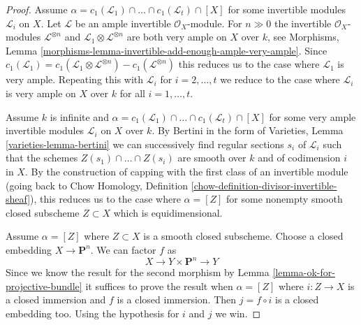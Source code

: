 \begin{proof}
\medskip\noindent
Assume
$\alpha = c_1(\mathcal{L}_1) \cap \ldots \cap c_1(\mathcal{L}_t) \cap [X]$
for some invertible modules $\mathcal{L}_i$ on $X$.
Let $\mathcal{L}$ be an ample invertible $\mathcal{O}_X$-module.
For $n \gg 0$ the invertible $\mathcal{O}_X$-modules
$\mathcal{L}^{\otimes n}$ and
$\mathcal{L}_1 \otimes \mathcal{L}^{\otimes n}$ are both
very ample on $X$ over $k$, see
Morphisms, Lemma \ref{morphisms-lemma-invertible-add-enough-ample-very-ample}.
Since $c_1(\mathcal{L}_1) = c_1(\mathcal{L}_1 \otimes \mathcal{L}^{\otimes n})
- c_1(\mathcal{L}^{\otimes n})$ this reduces us to the case where
$\mathcal{L}_1$ is very ample. Repeating this with $\mathcal{L}_i$
for $i = 2, \ldots, t$ we reduce to the case where $\mathcal{L}_i$
is very ample on $X$ over $k$ for all $i = 1, \ldots, t$.

\medskip\noindent
Assume $k$ is infinite and $\alpha = 
c_1(\mathcal{L}_1) \cap \ldots \cap c_1(\mathcal{L}_t) \cap [X]$
for some very ample invertible modules $\mathcal{L}_i$ on $X$ over $k$.
By Bertini in the form of Varieties, Lemma \ref{varieties-lemma-bertini}
we can successively find regular sections $s_i$ of $\mathcal{L}_i$
such that the schemes $Z(s_1) \cap \ldots \cap Z(s_i)$
are smooth over $k$ and of codimension $i$ in $X$.
By the construction of capping with the first class of
an invertible module (going back to
Chow Homology, Definition \ref{chow-definition-divisor-invertible-sheaf}),
this reduces us to the case where $\alpha = [Z]$
for some nonempty smooth closed subscheme $Z \subset X$ which
is equidimensional.

\medskip\noindent
Assume $\alpha = [Z]$ where $Z \subset X$ is a smooth closed subscheme.
Choose a closed embedding $X \to \mathbf{P}^n$. We can factor $f$ as
$$
X \to Y \times \mathbf{P}^n \to Y
$$
Since we know the result for the second morphism by
Lemma \ref{lemma-ok-for-projective-bundle}
it suffices to prove the result when
$\alpha = [Z]$ where $i : Z \to X$ is a closed immersion 
and $f$ is a closed immersion.
Then $j = f \circ i$ is a closed embedding too.
Using the hypothesis for $i$ and $j$ we win.


\end{proof}
